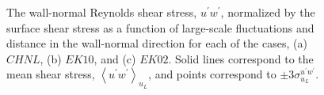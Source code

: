 \graphicspath{{chap2Img/}}
\begin{figure}[htb]
\caption{The wall-normal Reynolds shear stress, $u^\prime w^\prime$, normalized by the surface shear stress as a function of large-scale fluctuations and distance in the wall-normal direction for each of the cases, (a) $CHNL$, (b) $EK10$, and (c) $EK02$. Solid lines correspond to the mean shear stress, $\left< u^\prime w^\prime \right>_{u_L}$, and points correspond to $\pm 3 \sigma_{u_L}^{u^\prime w^\prime}$.} 
\label{fig:uw_uL}
\end{figure}

